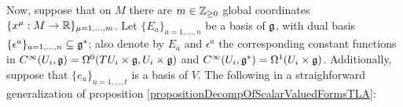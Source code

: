 


Now, suppose that on $M$ there are $m \in \mathbb{Z}_{\geq 0}$ global coordinates $\{x^\mu: M \to \mathbb{R}\}_{\mu = 1, \dots, m}$. Let $\{E_a\}_{a = 1, \dots, n}$ be a basis of $\mathfrak{g}$, with dual basis $\{\epsilon^a\}_{a = 1, \dots, n} \subset \alg g^*$; also denote by $E_a$ and $\epsilon^a$ the corresponding constant functions in $C^\infty(U_i, \mathfrak{g}) = \Omega^0(TU_i \times \mathfrak{g}, U_i \times \mathfrak{g})$ and $C^\infty(U_i, \mathfrak{g}^*) = \Omega^1(U_i \times \mathfrak{g})$. Additionally, suppose that $\{e_u\}_{u = 1, \dots, t}$ is a basis of $V$. The following in a straighforward generalization of proposition \ref{propositionDecompOfScalarValuedFormsTLA}:

